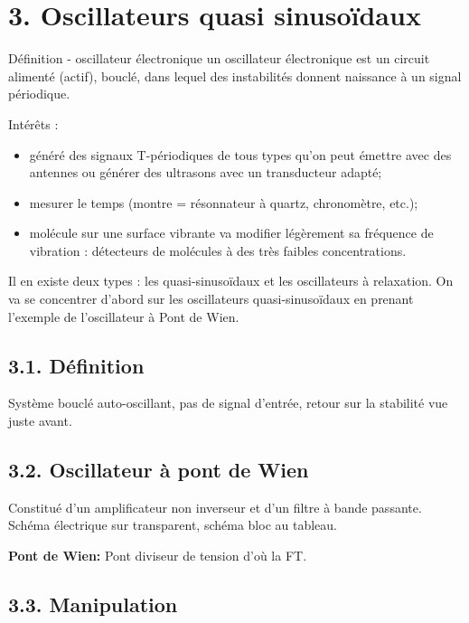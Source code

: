 \documentclass[french, a4paper, 10pt, twocolumn, landscape]{article}
\begin{document}
\section*{3. Oscillateurs quasi sinusoïdaux}

\begin{definition}{Définition - oscillateur électronique}
  un oscillateur électronique est un circuit alimenté (actif),
bouclé, dans lequel des instabilités donnent naissance à un signal périodique.
\end{definition}


Intérêts :
\begin{itemize}
  \item généré des signaux T-périodiques de tous types qu’on peut émettre avec des antennes ou générer des ultrasons avec un transducteur adapté;
  \item mesurer le temps (montre = résonnateur à quartz, chronomètre, etc.);
  \item molécule sur une surface vibrante va modifier légèrement sa fréquence de vibration : détecteurs de molécules à des très faibles concentrations. 
\end{itemize}

Il en existe deux types : les quasi-sinusoïdaux et les oscillateurs à relaxation. On va se concentrer d’abord sur les oscillateurs quasi-sinusoïdaux en prenant l’exemple de l’oscillateur à Pont de Wien.

\subsection*{3.1. Définition}

Système bouclé auto-oscillant, pas de signal d'entrée, retour sur la stabilité vue juste avant.

\subsection*{3.2. Oscillateur à pont de Wien}

Constitué d'un amplificateur non inverseur et d'un filtre à bande passante. Schéma électrique sur transparent, schéma bloc au tableau.\medskip


\textbf{Pont de Wien:} Pont diviseur de tension d'où la FT.

\subsection*{3.3. Manipulation}
\end{document}
